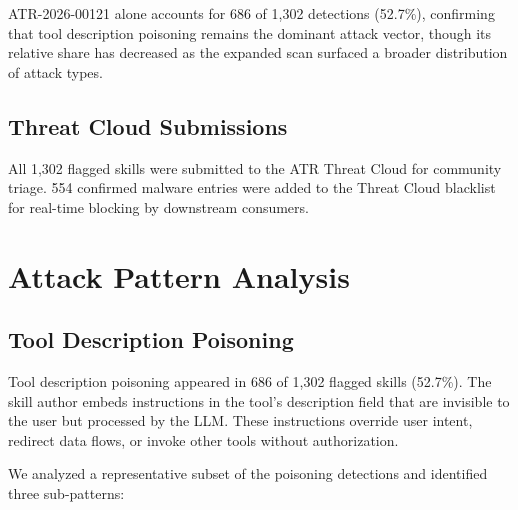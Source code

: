 \documentclass[letterpaper,twocolumn,10pt]{article}
\begin{document}
ATR-2026-00121 alone accounts for 686 of 1,302 detections (52.7\%),
confirming that tool description poisoning remains the dominant attack
vector, though its relative share has decreased as the expanded scan
surfaced a broader distribution of attack types.

\subsection{Threat Cloud Submissions}

All 1,302 flagged skills were submitted to the ATR Threat Cloud for
community triage.  554 confirmed malware entries were added to the
Threat Cloud blacklist for real-time blocking by downstream consumers.

%

\section{Attack Pattern Analysis}
\label{sec:patterns}

\subsection{Tool Description Poisoning}
\label{sec:poisoning}

Tool description poisoning appeared in 686 of 1,302 flagged skills
(52.7\%).  The skill author embeds instructions in the tool's description
field that are invisible to the user but processed by the LLM.  These
instructions override user intent, redirect data flows, or invoke other
tools without authorization.

We analyzed a representative subset of the poisoning detections and
identified three sub-patterns:
\end{document}

